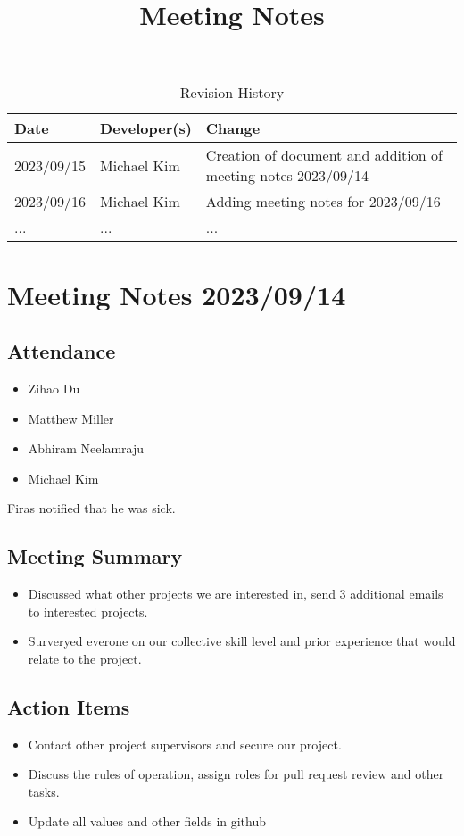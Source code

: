 \documentclass{article}
\title{Meeting Notes\\\progname}
\author{\authname}
\date{}
\begin{document}
\maketitle

\begin{table}[hp]
\caption{Revision History} \label{TblRevisionHistory}
\begin{tabularx}{\textwidth}{llX}
\toprule
\textbf{Date} & \textbf{Developer(s)} & \textbf{Change}\\
\midrule
2023/09/15 & Michael Kim & Creation of document and addition of meeting notes 2023/09/14 \\
2023/09/16 & Michael Kim & Adding meeting notes for 2023/09/16 \\
... & ... & ...\\
\bottomrule
\end{tabularx}
\end{table}

\section*{Meeting Notes 2023/09/14}

\subsection*{Attendance}
\begin{itemize}
\item Zihao Du 
\item Matthew Miller
\item Abhiram Neelamraju
\item Michael Kim
\end{itemize}
Firas notified that he was sick.

\subsection*{Meeting Summary}
\begin{itemize}
\item Discussed what other projects we are interested in, send 3 additional emails to interested projects.
\item Surveryed everone on our collective skill level and prior experience that would relate to the project.
\end{itemize}

\subsection*{Action Items}
\begin{itemize}
\item Contact other project supervisors and secure our project.
\item Discuss the rules of operation, assign roles for pull request review and other tasks.
\item Update all values and other fields in github
\end{itemize}
\end{document}
